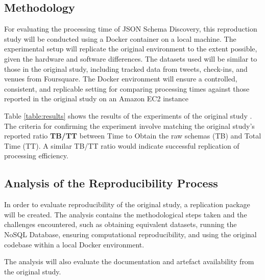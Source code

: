 \documentclass[sigconf, nonacm]{acmart}
\begin{document}
\subsection{Methodology }


\begin{table}[hb]
\centering
\caption{Results for Foursquare Datasets of the original Paper \cite{Frozza2018}. }
\label{table:results}
\end{table}

For evaluating the processing time of JSON Schema Discovery, this reproduction study will be conducted using a Docker container on a local machine. The experimental setup will replicate the original environment to the extent possible, given the hardware and software differences. The datasets used will be similar to those in the original study, including tracked data from tweets, check-ins, and venues from Foursquare. The Docker environment will ensure a controlled, consistent, and replicable setting for comparing processing times against those reported in the original study on an Amazon EC2 instance





Table \ref{table:results} shows the  results of the experiments of the original study \cite{Frozza2018}.
The criteria for confirming the experiment involve matching the original study's reported ratio \textbf{TB/TT} between Time to Obtain the raw schemas (TB) and Total Time (TT). A similar  TB/TT ratio would indicate successful replication of processing efficiency. 


\subsection{Analysis of the Reproducibility Process}

In order to evaluate reproducibility of the original study, a replication package will be created.  The analysis contains the methodological steps taken and the challenges encountered, such as obtaining equivalent datasets, running the NoSQL Database, ensuring computational reproducibility, and using the original codebase within a local Docker environment.

The analysis will also evaluate the documentation and artefact availability from the original study. 





\end{document}
